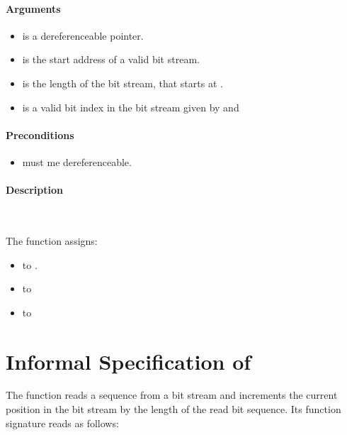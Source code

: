 \paragraph{Arguments}
\begin{itemize}
   \item  {} is a dereferenceable pointer.
   \item {} is  the start address of a valid bit stream.
   \item {} is the length of the bit stream, that starts at .
   \item {} is a valid bit index in the bit stream given by  and 
\end{itemize}

\paragraph{Preconditions}
\begin{itemize}
    \item  {} must me dereferenceable.
\end{itemize}

\paragraph{Description}~

The function \init assigns:
\begin{itemize}
    \item {}  to .
    \item {} to 
    \item {} to 
\end{itemize}


\clearpage

\section{Informal Specification of }

The function \peeknext reads a sequence from a bit stream 
and increments the current position in the bit stream by the 
length of the read bit sequence.
Its function signature reads as follows:\\[1em]


